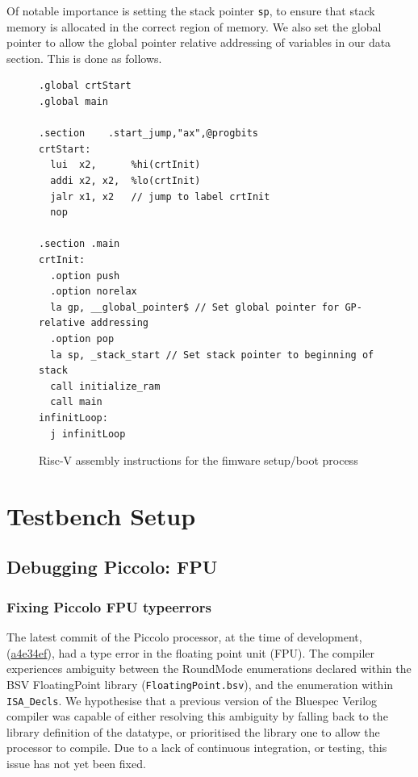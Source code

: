 \documentclass[a4paper,8pt]{report}
\begin{document}
Of notable importance is setting the stack pointer \texttt{sp}, to ensure that
stack memory is allocated in the correct region of memory. We also set the
global pointer to allow the global pointer relative addressing of variables in our
data section. This is done as follows.

\begin{figure}[h]
\lstset{language=[RISC-V]Assembler, style=customrv,xleftmargin=0.1\textwidth}
\begin{lstlisting}
.global crtStart
.global main

.section	.start_jump,"ax",@progbits
crtStart:
  lui  x2,      %hi(crtInit)
  addi x2, x2,  %lo(crtInit)
  jalr x1, x2   // jump to label crtInit
  nop

.section .main
crtInit:
  .option push
  .option norelax
  la gp, __global_pointer$ // Set global pointer for GP-relative addressing
  .option pop
  la sp, _stack_start // Set stack pointer to beginning of stack
  call initialize_ram
  call main
infinitLoop:
  j infinitLoop

\end{lstlisting}
\lstset{}
\caption{Risc-V assembly instructions for the fimware setup/boot process}
\end{figure}

\section{Testbench Setup}
\subsection{Debugging Piccolo: FPU}
\subsubsection{Fixing Piccolo FPU typeerrors}
The latest commit of the Piccolo processor, at the time of development,
(\href{https://github.com/bluespec/Piccolo/tree/a4e34ef2f2ba4e82a95faa2bbe3dd832ca3c51a0}{a4e34ef}),
had a type error in the floating point unit (FPU). The compiler experiences ambiguity between the RoundMode enumerations declared
within the BSV FloatingPoint library (\texttt{FloatingPoint.bsv}), and the
enumeration within \texttt{ISA\_Decls}. We hypothesise that a previous version
of the Bluespec Verilog compiler was capable of either resolving this ambiguity
by falling back to the library definition of the datatype, or prioritised the
library one to allow the processor to compile. Due to a lack of continuous
integration, or testing, this issue has not yet been fixed.
\end{document}
